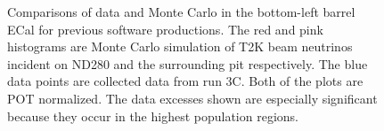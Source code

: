 \begin{figure}%
  \centering

  \caption{Comparisons of data and Monte Carlo in the bottom-left barrel ECal for previous software productions.  The red and pink histograms are Monte Carlo simulation of T2K beam neutrinos incident on ND280 and the surrounding pit respectively.  The blue data points are collected data from run 3C.  Both of the plots are POT normalized.  The data excesses shown are especially significant because they occur in the highest population regions.}
  \label{fig:BLBNoField}
\end{figure}
